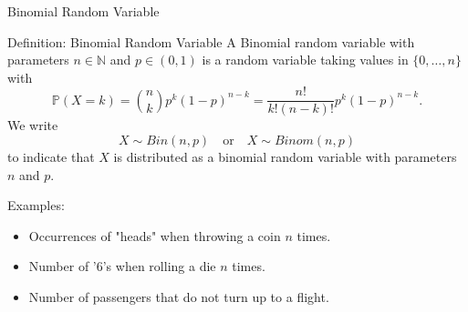 \documentclass[11pt,pdf,ngerman,UKenglish]{beamer}%
\newcommand{\IN}{\mathds{N}}
\newcommand{\IP}{\mathbb{P}}
\newcommand{\1}{\mathbb{1}}
\theoremstyle{thm}
\theoremstyle{def}
\begin{document}
\begin{frame}{Binomial Random Variable}
\begin{block}{Definition: Binomial Random Variable}
A Binomial random variable with parameters $n\in \IN$ and $p \in (0,1)$ is a random variable taking values in $\{0,\ldots,n\}$ with
$$\IP(X=k)= {n\choose k} p^k (1-p)^{n-k} = \frac{n!}{k!(n-k)!} p^k (1-p)^{n-k}.$$
We write
$$ X \sim Bin(n,p) \quad \text{or} \quad X \sim Binom(n,p)$$
to indicate that $X$ is distributed as a binomial random variable with parameters $n$ and $p$.
\end{block}
Examples:
\begin{itemize}
\item Occurrences of "heads" when throwing a coin $n$ times.
\item Number of '6's when rolling a die $n$ times.
\item Number of passengers that do not turn up to a flight.
\end{itemize}
\end{frame}


%
\end{document}
